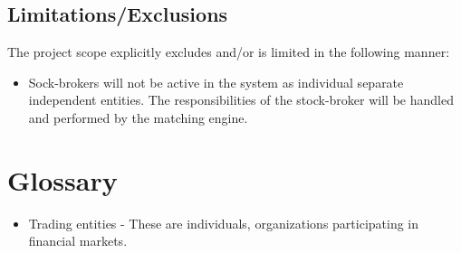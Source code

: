 \documentclass[12pt]{article}
\begin{document}
		\subsection{Limitations/Exclusions}
		The project scope explicitly excludes and/or is limited in the following manner:
		\begin{itemize}
		\item Sock-brokers will not be active in the system as individual separate independent entities. The responsibilities of the stock-broker will be handled and performed by the matching engine.
		\end{itemize}
	
		
	\newpage				    
	\section{Glossary}
	\begin{itemize}
	\item Trading entities - These are individuals, organizations participating in financial markets.
	\end{itemize}					    			    			    		
\end{document}
